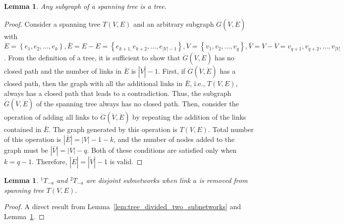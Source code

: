 \documentclass[10pt,english]{article}
\newtheorem{lemma}[theorem]{Lemma}
\begin{document}
\begin{lemma}
  Any subgraph of a spanning tree is a tree.
  \label{lem:subgraph_of_tree_is_tree}
\end{lemma}
\begin{proof}
  Consider a spanning tree $T\left(V,E\right)$ and an arbitrary subgraph $\dot{G}\left(\dot{V},\dot{E}\right)$ with $\dot{E}=\left\{e_1,e_2,\ldots,e_k\right\},\bar{E}=E-\dot{E}=\left\{e_{k+1,}e_{k+2},\ldots,e_{\left|V\right|-1}\right\},\dot{V}=\left\{v_1,v_2,\ldots,v_q\right\},\bar{V}=V-\dot{V}={v_{q+1},v_{q+2},\ldots,v_{\left|V\right|}}$. From the definition of a tree, it is sufficient to show that $\dot{G}\left(\dot{V},\dot{E}\right)$ has no closed path and the number of links in $\dot{E}$ is $\left|\dot{V}\right|-1$. First, if $\dot{G}\left(\dot{V},\dot{E}\right)$ has a closed path, then the graph with all the additional links in $\bar{E}$, i.e., $T\left(V,E\right)$, always has a closed path that leads to a contradiction. Thus, the subgraph $\dot{G}\left(\dot{V},\dot{E}\right)$ of the spanning tree always has no closed path. Then, consider the operation of adding all links to $\dot{G}\left(\dot{V},\dot{E}\right)$ by repeating the addition of the links contained in $\bar{E}$. The graph generated by this operation is $T\left(V,E\right)$. Total number of this operation is $\left|\bar{E}\right|=\left|V\right|-1-k$, and the number of nodes added to the graph must be $\left|\bar{V}\right|=\left|V\right|-q$. Both of these conditions are satisfied only when $k=q-1$. Therefore, $\left|\dot{E}\right|=\left|\dot{V}\right|-1$ is valid.
\end{proof}

\begin{lemma}
  ${^1}T_{-a}$  and ${^2}T_{-a}$  are disjoint subnetworks when link $a$ is removed from spanning tree $T\left(V,E\right)$.
  \label{lem:subnetworks_disjoint}
\end{lemma}
\begin{proof}
  A direct result from Lemma~\ref{lem:tree_divided_two_subnetworks} and Lemma~\ref{lem:subgraph_of_tree_is_tree}.
\end{proof}
\end{document}
